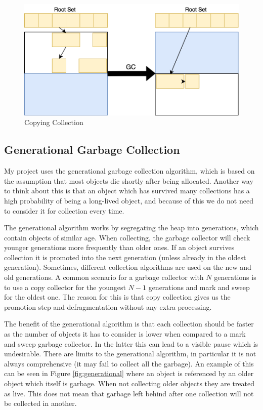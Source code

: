 \documentclass[../diss.tex]{subfiles}
\begin{document}
\begin{figure}
    \centering
    \includegraphics[max width=\linewidth]{figs/copycollection.png}
    \caption{Copying Collection}
    \label{fig:copyingcollection}
\end{figure}

\subsection{Generational Garbage Collection} \label{sec:generationalgarbagecollection}

My project uses the generational garbage collection algorithm\cite{generational}, which is based on the assumption that most objects die shortly after being allocated. Another way to think about this is that an object which has survived many collections has a high probability of being a long-lived object, and because of this we do not need to consider it for collection every time.

The generational algorithm works by segregating the heap into generations, which contain objects of similar age. When collecting, the garbage collector will check younger generations more frequently than older ones. If an object survives collection it is promoted into the next generation (unless already in the oldest generation). Sometimes, different collection algorithms are used on the new and old generations. A common scenario for a garbage collector with $N$ generations is to use a copy collector for the youngest $N-1$ generations and mark and sweep for the oldest one. The reason for this is that copy collection gives us the promotion step and defragmentation without any extra processing.

The benefit of the generational algorithm is that each collection should be faster as the number of objects it has to consider is lower when compared to a mark and sweep garbage collector. In the latter this can lead to a visible pause which is undesirable. There are limits to the generational algorithm, in particular it is not always comprehensive (it may fail to collect all the garbage). An example of this can be seen in Figure \ref{fig:generational} where an object is referenced by an older object which itself is garbage. When not collecting older objects they are treated as live. This does not mean that garbage left behind after one collection will not be collected in another.
\end{document}
